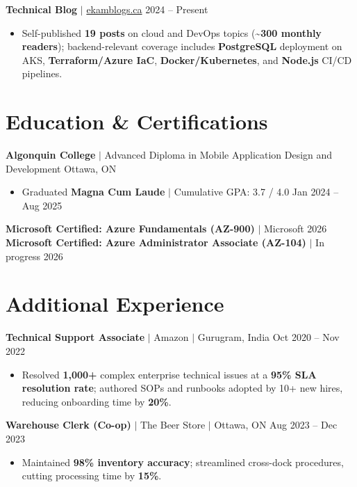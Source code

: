 \documentclass[11pt,a4paper]{article}
\begin{document}
\textbf{Technical Blog} $|$ \href{https://www.ekamblogs.ca}{ekamblogs.ca} \hfill 2024 -- Present
\begin{itemize}
    \item Self-published \textbf{19 posts} on cloud and DevOps topics (\textasciitilde\textbf{300 monthly readers}); backend-relevant coverage includes \textbf{PostgreSQL} deployment on AKS, \textbf{Terraform/Azure IaC}, \textbf{Docker/Kubernetes}, and \textbf{Node.js} CI/CD pipelines.
\end{itemize}

\section{Education \& Certifications}

\textbf{Algonquin College} $|$ Advanced Diploma in Mobile Application Design and Development \hfill Ottawa, ON
\begin{itemize}
    \item Graduated \textbf{Magna Cum Laude} $|$ Cumulative GPA: 3.7 / 4.0 \hfill Jan 2024 -- Aug 2025
\end{itemize}
\textbf{Microsoft Certified: Azure Fundamentals (AZ-900)} $|$ Microsoft \hfill 2026 \\
\textbf{Microsoft Certified: Azure Administrator Associate (AZ-104)} $|$ In progress \hfill 2026

\section{Additional Experience}

\textbf{Technical Support Associate} $|$ Amazon $|$ Gurugram, India \hfill Oct 2020 -- Nov 2022
\begin{itemize}
    \item Resolved \textbf{1,000+} complex enterprise technical issues at a \textbf{95\% SLA resolution rate}; authored SOPs and runbooks adopted by 10+ new hires, reducing onboarding time by \textbf{20\%}.
\end{itemize}

\vspace{4pt}

\textbf{Warehouse Clerk (Co-op)} $|$ The Beer Store $|$ Ottawa, ON \hfill Aug 2023 -- Dec 2023
\begin{itemize}
    \item Maintained \textbf{98\% inventory accuracy}; streamlined cross-dock procedures, cutting processing time by \textbf{15\%}.
\end{itemize}
\end{document}
